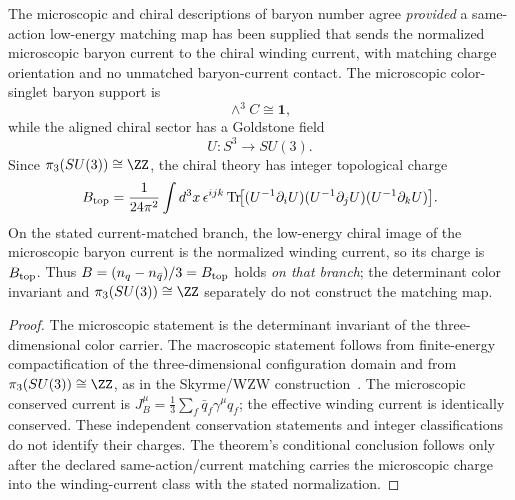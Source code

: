 \documentclass[12pt,a4paper]{article}
\begin{document}
\begin{theorem}
\label{p11:thm:microscopic-topological-baryon-matching}
The microscopic and chiral descriptions of baryon number agree \emph{provided} a same-action low-energy matching map has been supplied that sends the normalized microscopic baryon current to the chiral winding current, with matching charge orientation and no unmatched baryon-current contact.  The microscopic color-singlet baryon support is
\begin{equation}
\label{p11:eq:microscopic-baryon-color-singlet}
\wedge^3 C\cong\mathbf1,
\end{equation}
while the aligned chiral sector has a Goldstone field
\begin{equation}
\label{p11:eq:chiral-winding-map}
U:S^3\to SU(3).
\end{equation}
Since \(\pi_3(SU(3))\cong\ZZ\), the chiral theory has integer topological charge
\begin{equation}
\label{p11:eq:topological-baryon-number}
B_{\rm top}
=
\frac{1}{24\pi^2}
\int d^3x\,\epsilon^{ijk}
\operatorname{Tr}\!\bigl[
(U^{-1}\partial_iU)(U^{-1}\partial_jU)(U^{-1}\partial_kU)
\bigr].
\end{equation}
On the stated current-matched branch, the low-energy chiral image of the microscopic baryon current is the normalized winding current, so its charge is \(B_{\rm top}\). Thus \(B=(n_q-n_{\bar q})/3=B_{\rm top}\) holds \emph{on that branch}; the determinant color invariant and \(\pi_3(SU(3))\cong\ZZ\) separately do not construct the matching map.
\end{theorem}
\begin{proof}
The microscopic statement is the determinant invariant of the three-dimensional color carrier.  The macroscopic statement follows from finite-energy compactification of the three-dimensional configuration domain and from \(\pi_3(SU(3))\cong\ZZ\), as in the Skyrme/WZW construction~\cite{Skyrme1961,Witten1983Baryon,AdkinsNappiWitten1983}.  The microscopic conserved current is \(J_B^\mu=\frac13\sum_f\bar q_f\gamma^\mu q_f\); the effective winding current is identically conserved. These independent conservation statements and integer classifications do not identify their charges. The theorem's conditional conclusion follows only after the declared same-action/current matching carries the microscopic charge into the winding-current class with the stated normalization.
\end{proof}
\end{document}
